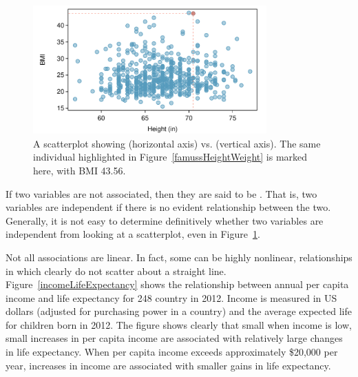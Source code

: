 \begin{doublespace}
\begin{figure}
\centering
\includegraphics[width=0.8\textwidth]
{ch_intro_to_data_oi_biostat/figures/famussHeightBmi/famussHeightBmi.pdf}
\caption{A scatterplot showing  (horizontal axis) vs.   (vertical axis). The same individual highlighted in Figure~\ref{famussHeightWeight} is marked here, with BMI 43.56.} 
\label{famussHeightBmi}
\end{figure}


If two variables are not associated, then they are said to be . That is, two variables are independent if there is no evident relationship between the two.  Generally, it is not easy to determine definitively whether two variables are independent from looking at a scatterplot, even in Figure~\ref{famussHeightBmi}.


Not all associations are linear.  In fact, some can be highly nonlinear, relationships in which clearly do not scatter about a straight line.  Figure~\ref{incomeLifeExpectancy} shows the relationship between annual per capita income and life expectancy for 248 country in 2012. Income is measured in US dollars (adjusted for purchasing power in a country) and the average expected life for children born in 2012.   The figure shows clearly that small when income is low, small increases in per capita income are associated with relatively large changes in life expectancy.  When per capita income exceeds approximately \$20,000 per year, increases in income are associated with smaller gains in life expectancy.



\end{doublespace}
